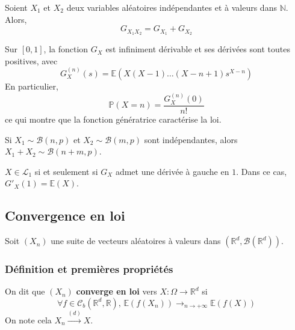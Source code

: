 	\begin{corollary}
		Soient $X_1$ et $X_2$ deux variables aléatoires indépendantes et à valeurs dans $\mathbb{N}$. Alors,
		\[ G_{X_1 X_2} = G_{X_1} + G_{X_2} \]
	\end{corollary}
	
	\begin{theorem}
		Sur $[0,1]$, la fonction $G_X$ est infiniment dérivable et ses dérivées sont toutes positives, avec
		\[ G_X^{(n)}(s) = \mathbb{E}(X(X-1) \dots (X-n+1)s^{X-n}) \]
		En particulier,
		\[ \mathbb{P}(X=n) = \frac{G_X^{(n)}(0)}{n!} \]
		ce qui montre que la fonction génératrice caractérise la loi.
	\end{theorem}
	
	
	\begin{example}
		Si $X_1 \sim \mathcal{B}(n, p)$ et $X_2 \sim \mathcal{B}(m, p)$ sont indépendantes, alors $X_1 + X_2 \sim \mathcal{B}(n + m, p)$.
	\end{example}
	
	
	\begin{theorem}
		$X \in \mathcal{L}_1$ si et seulement si $G_X$ admet une dérivée à gauche en $1$. Dans ce cas, $G'_X(1) = \mathbb{E}(X)$.
	\end{theorem}
	
	\subsection{Convergence en loi}
	
	Soit $(X_n)$ une suite de vecteurs aléatoires à valeurs dans $(\mathbb{R}^d, \mathcal{B}(\mathbb{R}^d))$.
	
	\subsubsection{Définition et premières propriétés}
	
	
	\begin{definition}
		On dit que $(X_n)$ \textbf{converge en loi} vers $X : \Omega \rightarrow \mathbb{R}^d$ si
		\[ \forall f \in \mathcal{C}_b(\mathbb{R}^d, \mathbb{R}), \, \mathbb{E}(f(X_n)) \longrightarrow_{n \rightarrow +\infty} \mathbb{E}(f(X)) \]
		On note cela $X_n \overset{(d)}{\longrightarrow} X$.
	\end{definition}
	
	
